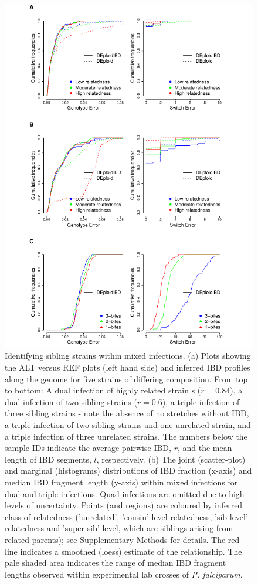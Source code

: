 \documentclass[9pt,lineno]{elife}
\begin{document}
\begin{figure}[ht]
  \begin{center}
  \includegraphics[width=\textwidth]{Fig3.pdf}
   \caption{Identifying sibling strains within mixed infections.  (a) Plots showing the ALT versus REF plots (left hand side) and inferred IBD profiles along the genome for five strains of differing composition.  From top to bottom: A dual infection of highly related strain s ($r=0.84$), a dual infection of two sibling strains ($r=0.6$), a triple infection of three sibling strains - note the absence of no stretches without IBD, a triple infection of two sibling strains and one unrelated strain, and a triple infection of three unrelated strains.  The numbers below the sample IDs indicate the average pairwise IBD, $r$, and the mean length of IBD segments, $l$, respectively.  (b) The joint (scatter-plot) and marginal (histograms) distributions of IBD fraction (x-axis) and median IBD fragment length (y-axis) within mixed infections for dual and triple infections.  Quad infections are omitted due to high levels of uncertainty. Points (and regions) are coloured by inferred class of relatedness ('unrelated', 'cousin'-level relatedness, 'sib-level' relatedness and 'super-sib' level, which are siblings arising from related parents); see Supplementary Methods for details.  The red line indicates a smoothed (loess) estimate of the relationship. The pale shaded area indicates the range of median IBD fragment lengths observed within experimental lab crosses of {\it P. falciparum}.}\label{fig:strainIBD}

\end{center}
\end{figure}
\end{document}
